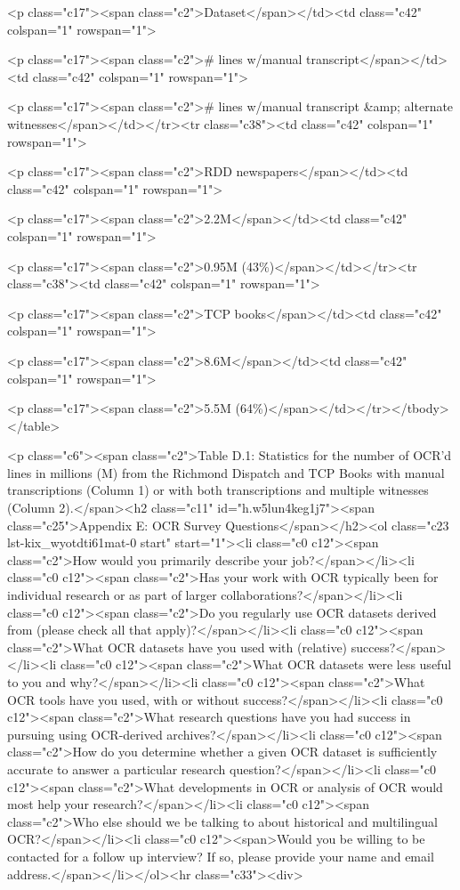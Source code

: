 \documentclass[twoside,11pt]{report}
\begin{document}
<p class="c17"><span class="c2">Dataset</span></td><td class="c42" colspan="1" rowspan="1">

<p class="c17"><span class="c2"># lines w/manual transcript</span></td><td class="c42" colspan="1" rowspan="1">

<p class="c17"><span class="c2"># lines w/manual transcript &amp; alternate witnesses</span></td></tr><tr class="c38"><td class="c42" colspan="1" rowspan="1">

<p class="c17"><span class="c2">RDD newspapers</span></td><td class="c42" colspan="1" rowspan="1">

<p class="c17"><span class="c2">2.2M</span></td><td class="c42" colspan="1" rowspan="1">

<p class="c17"><span class="c2">0.95M (43\%)</span></td></tr><tr class="c38"><td class="c42" colspan="1" rowspan="1">

<p class="c17"><span class="c2">TCP books</span></td><td class="c42" colspan="1" rowspan="1">

<p class="c17"><span class="c2">8.6M</span></td><td class="c42" colspan="1" rowspan="1">

<p class="c17"><span class="c2">5.5M (64\%)</span></td></tr></tbody></table>

<p class="c6"><span class="c2">Table D.1: Statistics for the number of OCR'd lines in millions (M) from the Richmond Dispatch and TCP Books with manual transcriptions (Column 1) or with both transcriptions and multiple witnesses (Column 2).</span><h2 class="c11" id="h.w5lun4keg1j7"><span class="c25">Appendix E: OCR Survey Questions</span></h2><ol class="c23 lst-kix_wyotdti61mat-0 start" start="1"><li class="c0 c12"><span class="c2">How would you primarily describe your job?</span></li><li class="c0 c12"><span class="c2">Has your work with OCR typically been for individual research or as part of larger collaborations?</span></li><li class="c0 c12"><span class="c2">Do you regularly use OCR datasets derived from (please check all that apply)?</span></li><li class="c0 c12"><span class="c2">What OCR datasets have you used with (relative) success?</span></li><li class="c0 c12"><span class="c2">What OCR datasets were less useful to you and why?</span></li><li class="c0 c12"><span class="c2">What OCR tools have you used, with or without success?</span></li><li class="c0 c12"><span class="c2">What research questions have you had success in pursuing using OCR-derived archives?</span></li><li class="c0 c12"><span class="c2">How do you determine whether a given OCR dataset is sufficiently accurate to answer a particular research question?</span></li><li class="c0 c12"><span class="c2">What developments in OCR or analysis of OCR would most help your research?</span></li><li class="c0 c12"><span class="c2">Who else should we be talking to about historical and multilingual OCR?</span></li><li class="c0 c12"><span>Would you be willing to be contacted for a follow up interview? If so, please provide your name and email address.</span></li></ol><hr class="c33"><div>
\end{document}
